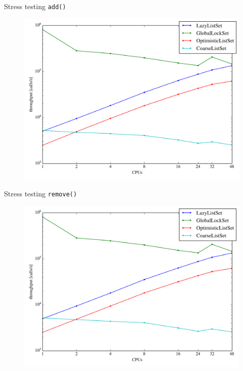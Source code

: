 \documentclass[aspectratio=43]{beamer}
\begin{document}
\begin{frame}{Stress testing \texttt{add()}}
  \begin{figure}
    \includegraphics[width=\textwidth]{add}
  \end{figure}  
\end{frame}

\begin{frame}{Stress testing \texttt{remove()}}
  \begin{figure}
    \includegraphics[width=\textwidth]{remove}
  \end{figure}  
\end{frame}
\end{document}

